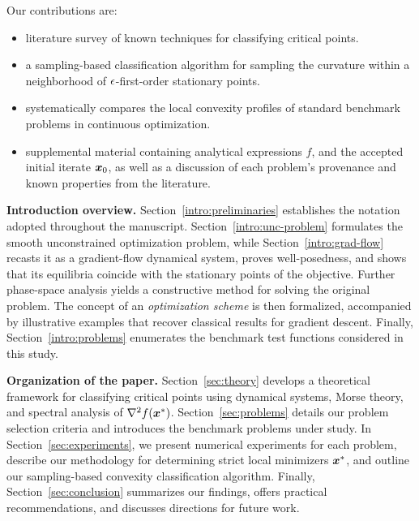 \documentclass[10pt]{article}
\begin{document}
    \medskip

    Our contributions are:
    \begin{itemize}
        \item literature survey of known techniques for classifying critical points.
        \item a sampling-based classification algorithm for sampling the curvature
        within a neighborhood of $\epsilon$-first-order stationary points. 
        \item systematically compares the local convexity profiles of standard
        benchmark problems in continuous optimization. 
        \item supplemental material containing analytical expressions $f$, and the
        accepted initial iterate $\bm{x}_0$, as well as a discussion of
        each problem's provenance and known properties from the literature. 
    \end{itemize}
    
    \medskip

    \textbf{Introduction overview.} Section~\ref{intro:preliminaries} establishes the notation adopted throughout the manuscript.  
    Section~\ref{intro:unc-problem} formulates the smooth unconstrained optimization problem, while Section~\ref{intro:grad-flow} 
    recasts it as a gradient-flow dynamical system, proves well-posedness, and shows that its equilibria coincide with the stationary
    points of the objective. Further phase-space analysis yields a constructive method for solving the original problem.  
    The concept of an \emph{optimization scheme} is then formalized, accompanied by illustrative examples that recover 
    classical results for gradient descent. Finally, Section~\ref{intro:problems} enumerates the benchmark test functions
    considered in this study.

    \medskip

    \textbf{Organization of the paper.} Section~\ref{sec:theory} develops a theoretical framework for classifying critical 
    points using dynamical systems, Morse theory, and spectral analysis of $\nabla^2 f(\bm{x}^*)$. Section~\ref{sec:problems} 
    details our problem selection criteria and introduces the benchmark problems under study. In Section~\ref{sec:experiments}, 
    we present numerical experiments for each problem, describe our methodology for determining strict local minimizers $\bm{x}^*$,
    and outline our sampling-based convexity classification algorithm. Finally, Section~\ref{sec:conclusion} summarizes our findings, 
    offers practical recommendations, and discusses directions for future work.
\end{document}
